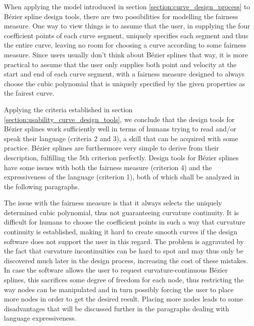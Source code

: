 \documentclass[a4paper]{article}
\begin{document}
				When applying the model introduced in section \ref{section:curve_design_process} to Bézier spline design tools, there are two possibilities for modelling the fairness measure. One way to view things is to assume that the user, in supplying the four coefficient points of each curve segment, uniquely specifies each segment and thus the entire curve, leaving no room for choosing a curve according to some fairness measure. Since users usually don't think about Bézier splines that way, it is more practical to assume that the user only supplies both point and velocity at the start and end of each curve segment, with a fairness measure designed to always choose the cubic polynomial that is uniquely specified by the given properties as the fairest curve.

				Applying the criteria established in section \ref{section:usability_curve_design_tools}, we conclude that the design tools for Bézier splines work sufficiently well in terms of humans trying to read and/or speak their language (criteria 2 and 3), a skill that can be acquired with some practice. Bézier splines are furthermore very simple to derive from their description, fulfilling the 5th criterion perfectly. Design tools for Bézier splines have some issues with both the fairness measure (criterion 4) and the expressiveness of the language (criterion 1), both of which shall be analyzed in the following paragraphs.

				The issue with the fairness measure is that it always selects the uniquely determined cubic polynomial, thus not guaranteeing curvature continuity. It is difficult for humans to choose the coefficient points in such a way that curvature continuity is established, making it hard to create smooth curves if the design software does not support the user in this regard. The problem is aggravated by the fact that curvature incontinuities can be hard to spot and may thus only be discovered much later in the design process, increasing the cost of these mistakes. In case the software allows the user to request curvature-continuous Bézier splines, this sacrifices some degree of freedom for each node, thus restricting the way nodes can be manipulated and in turn possibly forcing the user to place more nodes in order to get the desired result. Placing more nodes leads to some disadvantages that will be discussed further in the paragraphs dealing with language expressiveness.
\end{document}
